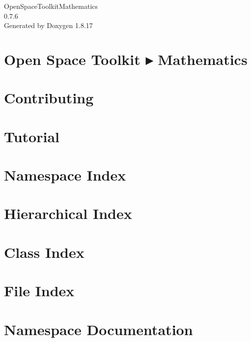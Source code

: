 \let\mypdfximage\pdfximage\def\pdfximage{\immediate\mypdfximage}\documentclass[twoside]{book}
\newcommand{\+}{\discretionary{\mbox{\scriptsize$\hookleftarrow$}}{}{}}
\newcommand{\clearemptydoublepage}{%
  \newpage{\pagestyle{empty}\cleardoublepage}%
}
\begin{document}
\hypersetup{pageanchor=false,
             bookmarksnumbered=true,
             pdfencoding=unicode
            }
\begin{titlepage}
\vspace*{7cm}
\begin{center}%
{\Large Open\+Space\+Toolkit\+Mathematics \\[1ex]\large 0.\+7.\+6 }\\
\vspace*{1cm}
{\large Generated by Doxygen 1.8.17}\\
\end{center}
\end{titlepage}
\clearemptydoublepage
{}
\tableofcontents
\clearemptydoublepage
{}
\hypersetup{pageanchor=true}

\chapter{Open Space Toolkit ▸ Mathematics}
\label{index}\hypertarget{index}{}
\chapter{Contributing}
\label{md__c_o_n_t_r_i_b_u_t_i_n_g}

\chapter{Tutorial}
\label{md_docs__tutorial}

\chapter{Namespace Index}

\chapter{Hierarchical Index}

\chapter{Class Index}

\chapter{File Index}

\chapter{Namespace Documentation}













\end{document}

